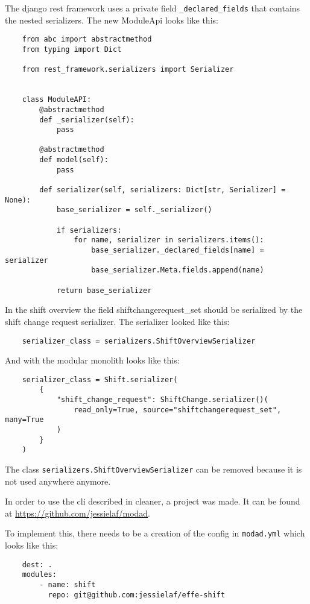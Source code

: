 The django rest framework uses a private field \texttt{\_declared\_fields} that contains the nested serializers. The new ModuleApi looks like this:
\begin{verbatim}
    from abc import abstractmethod
    from typing import Dict

    from rest_framework.serializers import Serializer


    class ModuleAPI:
        @abstractmethod
        def _serializer(self):
            pass

        @abstractmethod
        def model(self):
            pass

        def serializer(self, serializers: Dict[str, Serializer] = None):
            base_serializer = self._serializer()

            if serializers:
                for name, serializer in serializers.items():
                    base_serializer._declared_fields[name] = serializer
                    base_serializer.Meta.fields.append(name)

            return base_serializer
\end{verbatim}

In the shift overview the field shiftchangerequest\_set should be serialized by the shift change request serializer. The serializer looked like this:
\begin{verbatim}
    serializer_class = serializers.ShiftOverviewSerializer
\end{verbatim}

And with the modular monolith looks like this:
\begin{verbatim}
    serializer_class = Shift.serializer(
        {
            "shift_change_request": ShiftChange.serializer()(
                read_only=True, source="shiftchangerequest_set", many=True
            )
        }
    )
\end{verbatim}

The class \texttt{serializers.ShiftOverviewSerializer} can be removed because it is not used anywhere anymore.

In order to use the cli described in  cleaner, a project was made. It can be found at \url{https://github.com/jessielaf/modad}.

To implement this, there needs to be a creation of the config in \texttt{modad.yml} which looks like this:
\begin{verbatim}
    dest: .
    modules:
        - name: shift
          repo: git@github.com:jessielaf/effe-shift
\end{verbatim}

